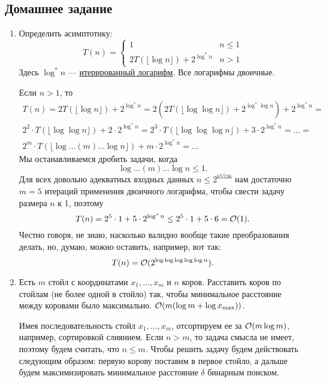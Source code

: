 \subsection{Домашнее задание}
\begin{enumerate}
  \item 
	Определить асимптотику:
	$$T(n) =
	  \begin{cases}
	    1 & n \le 1 \\
	    2 T(\lfloor \log n \rfloor) + 2^{\log^* n} & n > 1
	  \end{cases}
	$$
	Здесь $\log^* n$ --- \href{https://en.wikipedia.org/wiki/Iterated_logarithm}{итерированный логарифм}.
	Все логарифмы двоичные.
	\begin{solution}
		Если $n > 1$, то 
		\begin{eqnarray}
			T(n) = 2 T(\lfloor \log n \rfloor) + 2^{\log^* n} = 2 (2 T(\lfloor \log \log n \rfloor) + 2^{\log^* \log n}) + 2^{\log^* n} = \\
			2^2 \cdot T(\lfloor \log \log n \rfloor) + 2\cdot2^{\log^* n} = 2^3 \cdot T(\lfloor \log \log \log n \rfloor) + 3 \cdot 2^{\log^* n} = \ldots = \\
			2^m \cdot T(\lfloor \log \ldots (m) \ldots \log n \rfloor) + m \cdot 2^{\log^* n} = \ldots
		\end{eqnarray}
		Мы останавливаемся дробить задачи, когда
		\begin{equation}
			\log \ldots (m) \ldots \log n \leq 1.
		\end{equation}
		Для всех довольно адекватных входных данных $n \leq 2^{65536}$ нам достаточно $m=5$ итераций применения двоичного логарифма, чтобы свести задачу размера $n$ к 1, поэтому
		\begin{equation}
			T(n) = 2^5 \cdot 1 + 5 \cdot 2^{\log^* n} \leq 2^5 \cdot 1 + 5 \cdot 6 = \mathcal{O}(1).
		\end{equation}
		Честно говоря, не знаю, насколько валидно вообще такие преобразования делать, но, думаю, можно оставить, например, вот так:
		\begin{equation}
			T(n) = \mathcal{O}(2^{\log \log \log \log \log n}).
		\end{equation}
	\end{solution}

  \item 
	Есть $m$ стойл с координатами $x_1, \ldots, x_m$ и $n$ коров. Расставить коров по стойлам
	(не более одной в стойло) так, чтобы минимальное расстояние между коровами было максимально.
	$\mathcal{O}(m (\log{m} + \log{x_{\max}}))$.
	\begin{solution}
		Имея последовательность стойл $x_1, \ldots, x_m$, отсортируем ее за $\mathcal{O}(m \log m)$, например, сортировкой слиянием. Если $n > m$, то задача смысла не имеет, поэтому будем считать, что $n \leq m$. Чтобы решить задачу будем действовать следующим образом: первую корову поставим в первое стойло, а дальше будем максимизировать минимальное расстояние $\delta$ бинарным поиском.
		

\end{solution}
\end{enumerate}
